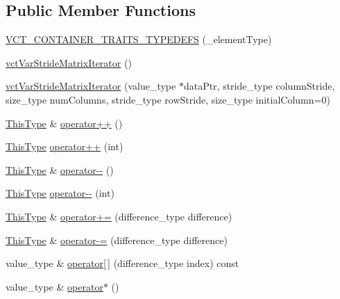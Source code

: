 \subsection*{Public Member Functions}
\begin{DoxyCompactItemize}
\item 
\hyperlink{classvct_var_stride_matrix_iterator_ad10863eaa1222765fd9eeb8dfb58bd41}{V\-C\-T\-\_\-\-C\-O\-N\-T\-A\-I\-N\-E\-R\-\_\-\-T\-R\-A\-I\-T\-S\-\_\-\-T\-Y\-P\-E\-D\-E\-F\-S} (\-\_\-element\-Type)
\item 
\hyperlink{classvct_var_stride_matrix_iterator_a91d9083a1180d5eea8a91f9fd013eb95}{vct\-Var\-Stride\-Matrix\-Iterator} ()
\item 
\hyperlink{classvct_var_stride_matrix_iterator_a458fe56a6f92431c0b63aebbbb87e257}{vct\-Var\-Stride\-Matrix\-Iterator} (value\-\_\-type $\ast$data\-Ptr, stride\-\_\-type column\-Stride, size\-\_\-type num\-Columns, stride\-\_\-type row\-Stride, size\-\_\-type initial\-Column=0)
\item 
\hyperlink{classvct_var_stride_matrix_const_iterator_af68182ea2024c532e999fd1333cb0c6e}{This\-Type} \& \hyperlink{classvct_var_stride_matrix_iterator_a4b8fe42309794755c854d04efb2eb90b}{operator++} ()
\item 
\hyperlink{classvct_var_stride_matrix_const_iterator_af68182ea2024c532e999fd1333cb0c6e}{This\-Type} \hyperlink{classvct_var_stride_matrix_iterator_a5ff0237367032cd027470c1f23edd943}{operator++} (int)
\item 
\hyperlink{classvct_var_stride_matrix_const_iterator_af68182ea2024c532e999fd1333cb0c6e}{This\-Type} \& \hyperlink{classvct_var_stride_matrix_iterator_a55ff9d23cd962659b4057c3f9fc34cdf}{operator-\/-\/} ()
\item 
\hyperlink{classvct_var_stride_matrix_const_iterator_af68182ea2024c532e999fd1333cb0c6e}{This\-Type} \hyperlink{classvct_var_stride_matrix_iterator_a6d10e5918b881d69c226855fe90bfa7a}{operator-\/-\/} (int)
\item 
\hyperlink{classvct_var_stride_matrix_const_iterator_af68182ea2024c532e999fd1333cb0c6e}{This\-Type} \& \hyperlink{classvct_var_stride_matrix_iterator_a44a3c7884b5092d51a2c17d87096a69e}{operator+=} (difference\-\_\-type difference)
\item 
\hyperlink{classvct_var_stride_matrix_const_iterator_af68182ea2024c532e999fd1333cb0c6e}{This\-Type} \& \hyperlink{classvct_var_stride_matrix_iterator_ab72c54ac990087995a41e0a6b99bd9de}{operator-\/=} (difference\-\_\-type difference)
\item 
value\-\_\-type \& \hyperlink{classvct_var_stride_matrix_iterator_a84a6c213039c241a96a80888c4054b48}{operator\mbox{[}$\,$\mbox{]}} (difference\-\_\-type index) const 
\item 
value\-\_\-type \& \hyperlink{classvct_var_stride_matrix_iterator_af938d4d030807e31284107d51f64785a}{operator$\ast$} ()
\end{DoxyCompactItemize}
